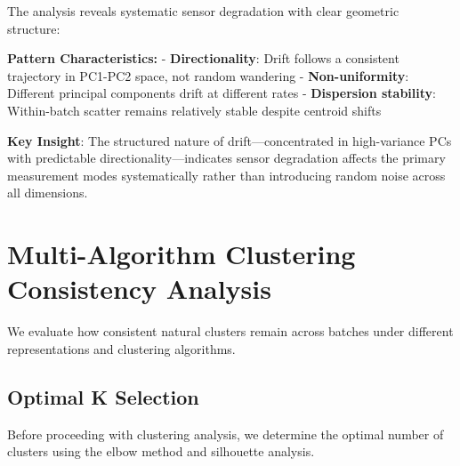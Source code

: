 \documentclass[
  letterpaper,
  DIV=11,
  numbers=noendperiod]{scrartcl}
\begin{document}
The analysis reveals systematic sensor degradation with clear geometric
structure:

\textbf{Pattern Characteristics:} - \textbf{Directionality}: Drift
follows a consistent trajectory in PC1-PC2 space, not random wandering -
\textbf{Non-uniformity}: Different principal components drift at
different rates - \textbf{Dispersion stability}: Within-batch scatter
remains relatively stable despite centroid shifts

\textbf{Key Insight}: The structured nature of drift---concentrated in
high-variance PCs with predictable directionality---indicates sensor
degradation affects the primary measurement modes systematically rather
than introducing random noise across all dimensions.

\section{Multi-Algorithm Clustering Consistency
Analysis}\label{multi-algorithm-clustering-consistency-analysis}

We evaluate how consistent natural clusters remain across batches under
different representations and clustering algorithms.

\subsection{Optimal K Selection}\label{optimal-k-selection}

Before proceeding with clustering analysis, we determine the optimal
number of clusters using the elbow method and silhouette analysis.
\end{document}
